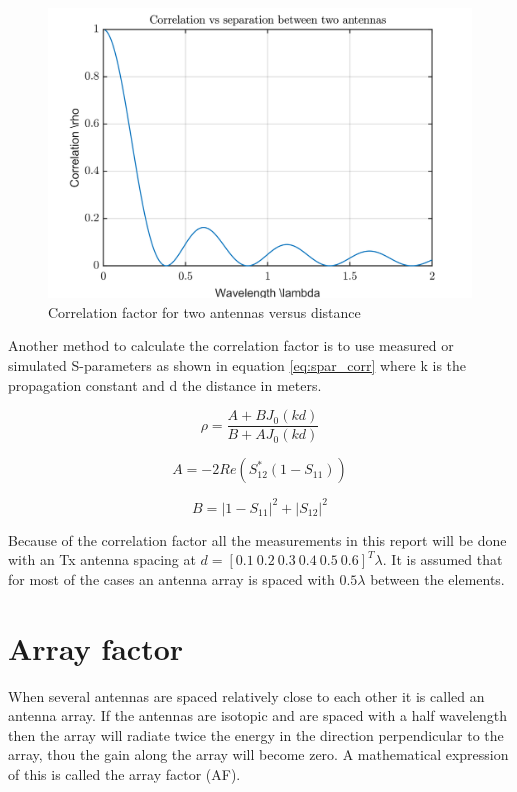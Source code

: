 \begin{figure}[H]
\centering 
\includegraphics[scale = 0.7]{figures/ch1/correlation.png}
\caption{Correlation factor for two antennas versus distance}
\label{fig:correlation}
\end{figure}

Another method to calculate the correlation factor is to use measured or simulated S-parameters as shown in equation \ref{eq:spar_corr} \citep{wang2011} where k is the propagation constant and d the distance in meters. 

\begin{equation} \label{eq:spar_corr}
\rho = \frac{A+B J_0(kd)}{B+A J_0(kd)}
\end{equation}

\begin{equation} 
A = -2Re(S_{12}^*(1-S_{11}))
\end{equation}

\begin{equation} 
B = |1-S_{11}|^2 + |S_{12}|^2
\end{equation}

Because of the correlation factor all the measurements in this report will be done with an Tx antenna spacing at $d = [0.1 \ 0.2 \ 0.3 \ 0.4 \ 0.5 \ 0.6]^T \lambda$. It is assumed that for most of the cases an antenna array is spaced with $0.5\lambda$ between the elements. 

\section{Array factor}
When several antennas are spaced relatively close to each other it is called an antenna array. If the antennas are isotopic and are spaced with a half wavelength then the array will radiate twice the energy in the direction perpendicular to the array, thou the gain along the array will become zero. A mathematical expression of this is called the array factor (AF).

